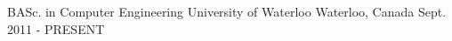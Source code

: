 \begin{cventries}
  \cventry
    {BASc. in Computer Engineering}
    {University of Waterloo}
    {Waterloo, Canada}
    {Sept. 2011 - PRESENT}
    {}
    \vspace{-4mm}
    
\end{cventries}
